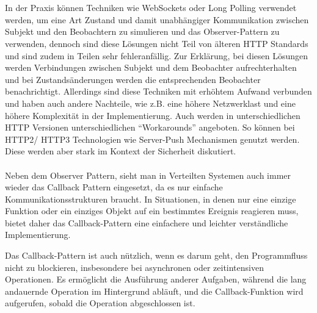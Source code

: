 \\\\
In der Praxis können Techniken wie WebSockets oder Long Polling verwendet werden, um eine Art Zustand und damit unabhängiger Kommunikation zwischen Subjekt und den Beobachtern zu simulieren und das Observer-Pattern zu verwenden, dennoch sind diese Lösungen nicht Teil von älteren HTTP Standards und sind zudem in Teilen sehr fehleranfällig. Zur Erklärung, bei diesen Lösungen werden Verbindungen zwischen Subjekt und dem Beobachter aufrechterhalten und bei Zustandsänderungen werden die entsprechenden Beobachter benachrichtigt. Allerdings sind diese Techniken mit erhöhtem Aufwand verbunden und haben auch andere Nachteile, wie z.B. eine höhere Netzwerklast und eine höhere Komplexität in der Implementierung. 
Auch werden in unterschiedlichen HTTP Versionen unterschiedlichen \enquote{Workarounds} angeboten. So können bei HTTP2/ HTTP3 Technologien wie Server-Push Mechanismen genutzt werden. Diese werden aber stark im Kontext der Sicherheit diskutiert. 
\\\\
Neben dem Observer Pattern, sieht man in Verteilten Systemen auch immer wieder das Callback Pattern eingesetzt, da es nur einfache Kommunikationsstrukturen braucht. In Situationen, in denen nur eine einzige Funktion oder ein einziges Objekt auf ein bestimmtes Ereignis reagieren muss, bietet daher das Callback-Pattern eine einfachere und leichter verständliche Implementierung.

Das Callback-Pattern ist auch nützlich, wenn es darum geht, den Programmfluss nicht zu blockieren, insbesondere bei asynchronen oder zeitintensiven Operationen. Es ermöglicht die Ausführung anderer Aufgaben, während die lang andauernde Operation im Hintergrund abläuft, und die Callback-Funktion wird aufgerufen, sobald die Operation abgeschlossen ist.


